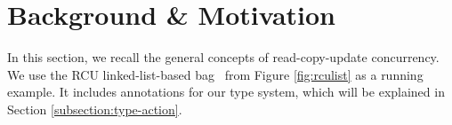 \section{Background \& Motivation}
In this section, we recall the general concepts of read-copy-update concurrency.
We use the RCU linked-list-based bag~\cite{McKenney2015SomeEO} from Figure \ref{fig:rculist} as a running example.  It includes annotations for our type system, which will be explained in Section \ref{subsection:type-action}.
